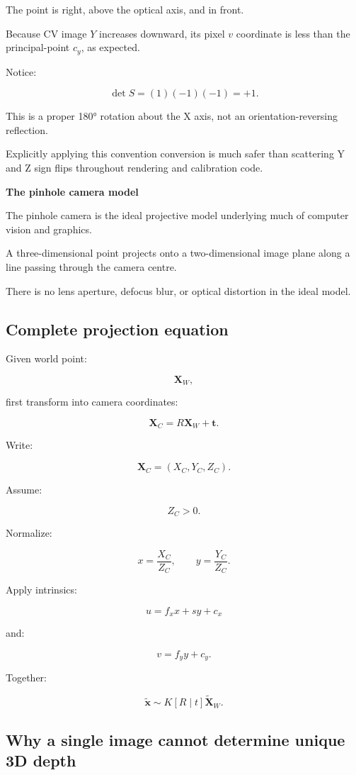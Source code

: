 The point is right, above the optical axis, and in front.

Because CV image \(Y\) increases downward, its pixel \(v\) coordinate is less than the principal-point \(c_y\), as expected.

Notice:

\[
 \det S=(1)(-1)(-1)=+1.
\]

This is a proper 180° rotation about the X axis, not an orientation-reversing reflection.

Explicitly applying this convention conversion is much safer than scattering Y and Z sign flips throughout rendering and calibration code.

\textbf{The pinhole camera model}

The pinhole camera is the ideal projective model underlying much of computer vision and graphics.

A three-dimensional point projects onto a two-dimensional image plane along a line passing through the camera centre.

There is no lens aperture, defocus blur, or optical distortion in the ideal model.

\subsection{Complete projection equation}\label{02-foundations-ii-ch035-complete-projection-equation}

Given world point:

\[
 \mathbf X_W,
\]

first transform into camera coordinates:

\[
 \boxed{ \mathbf X_C=R\mathbf X_W+\mathbf t }.
\]

Write:

\[
 \mathbf X_C=(X_C,Y_C,Z_C).
\]

Assume:

\[
 Z_C>0.
\]

Normalize:

\[
 \boxed{ x=\frac{X_C}{Z_C}, \qquad y=\frac{Y_C}{Z_C} }.
\]

Apply intrinsics:

\[
 \boxed{ u=f_xx+sy+c_x }
\]

and:

\[
 \boxed{ v=f_yy+c_y }.
\]

Together:

\[
 \boxed{ \tilde{\mathbf x} \sim K[R\mid t]\tilde{\mathbf X}_W }.
\]

\subsection{Why a single image cannot determine unique 3D depth}\label{02-foundations-ii-ch035-why-a-single-image-cannot-determine-unique-3d-depth}

